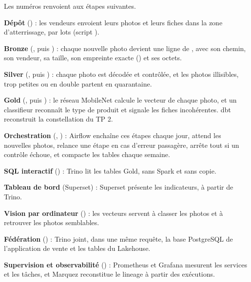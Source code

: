Les numéros renvoient aux étapes suivantes.

\begin{description}[leftmargin=1.4em,labelindent=0pt,itemsep=3pt,font=\normalfont]
\item[\etape{1}] \textbf{Dépôt} () : les vendeurs envoient leurs photos et
  leurs fiches dans la zone d'atterrissage, par lots (script ).
\item[\etape{2}] \textbf{Bronze} (, puis ) : chaque nouvelle
  photo devient une ligne de , avec son chemin, son vendeur, sa taille, son
  empreinte exacte () et ses octets.
\item[\etape{3}] \textbf{Silver} (, puis ) : chaque photo est
  décodée et contrôlée, et les photos illisibles, trop petites ou en double partent en quarantaine.
\item[\etape{4}] \textbf{Gold} (, puis ) : le réseau MobileNet
  calcule le vecteur de chaque photo, et un classifieur reconnaît le type de produit et signale les
  fiches incohérentes. dbt reconstruit la constellation du TP 2.
\item[\etape{5}] \textbf{Orchestration} (, ) : Airflow
  enchaîne ces étapes chaque jour, attend les nouvelles photos, relance une étape en cas d'erreur
  passagère, arrête tout si un contrôle échoue, et compacte les tables chaque semaine.
\item[\etape{6}] \textbf{SQL interactif} () : Trino lit les tables Gold, sans
  Spark et sans copie.
\item[\etape{7}] \textbf{Tableau de bord} (Superset) : Superset présente les indicateurs, à partir de Trino.
\item[\etape{8}] \textbf{Vision par ordinateur} () : les vecteurs servent à
  classer les photos et à retrouver les photos semblables.
\item[\etape{9}] \textbf{Fédération} () : Trino joint, dans une même requête,
  la base PostgreSQL de l'application de vente et les tables du Lakehouse.
\item[\etape{10}] \textbf{Supervision et observabilité} () : Prometheus
  et Grafana mesurent les services et les tâches, et Marquez reconstitue le lineage à partir des
  exécutions.
\end{description}

